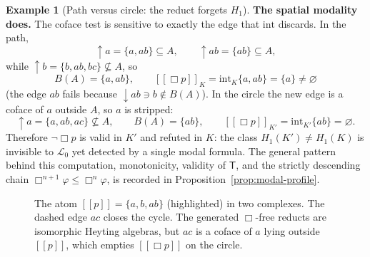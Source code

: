 \documentclass[final,12pt]{elsarticle}
\newcommand{\llbracket}{[\![}
\newcommand{\rrbracket}{]\!]}
\theoremstyle{plain}
\theoremstyle{definition}
\newtheorem{exa}[thm]{Example}
\begin{document}
\begin{exa}[Path versus circle: the reduct forgets \(H_1\)]
\medskip
\noindent\textbf{The spatial modality does.}
The coface test is sensitive to exactly the edge that \(\mathrm{int}\) discards.
In the path,
\[
  \uparrow\!a=\{a,ab\}\subseteq A,
  \qquad
  \uparrow\!ab=\{ab\}\subseteq A,
\]
while \(\uparrow\!b=\{b,ab,bc\}\not\subseteq A\), so
\[
  B(A)=\{a,ab\},
  \qquad
  \llbracket\Box p\rrbracket_{K}
    =\mathrm{int}_{K}\{a,ab\}=\{a\}\neq\varnothing
\]
(the edge \(ab\) fails because \(\downarrow\!ab\ni b\notin B(A)\)).  In the
circle the new edge is a coface of \(a\) outside \(A\), so \(a\) is stripped:
\[
  \uparrow\!a=\{a,ab,ac\}\not\subseteq A,
  \qquad
  B(A)=\{ab\},
  \qquad
  \llbracket\Box p\rrbracket_{K'}
    =\mathrm{int}_{K'}\{ab\}=\varnothing .
\]
Therefore \(\neg\Box p\) is valid in \(K'\) and refuted in \(K\): the class
\(H_1(K')\neq H_1(K)\) is invisible to \(\mathcal{L}_0\) yet detected by a
single modal formula. The general pattern behind this computation, monotonicity, validity of
\(\mathsf{T}\), and the strictly descending chain
\(\Box^{n+1}\varphi\le\Box^{n}\varphi\), is recorded in
Proposition~\ref{prop:modal-profile}.

\end{exa}

\begin{figure}[htbp]
\centering
{}
\caption{The atom \(\llbracket p\rrbracket=\{a,b,ab\}\) (highlighted) in two
complexes.  The dashed edge \(ac\) closes the cycle.  The generated
\(\Box\)-free reducts are isomorphic Heyting algebras, but \(ac\) is a coface of
\(a\) lying outside \(\llbracket p\rrbracket\), which empties
\(\llbracket\Box p\rrbracket\) on the circle.}
\label{fig:path-vs-circle}
\end{figure}
\end{document}
